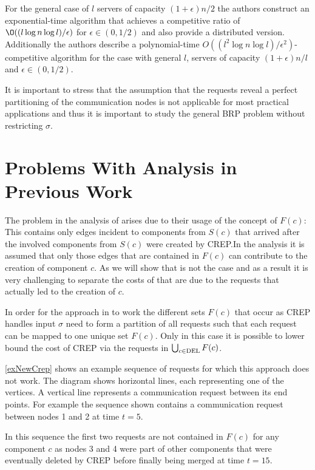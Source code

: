 \documentclass[a4paper,xcolor=dvipsnames, tikz, 12pt]{article}
\newcommand{\nl}{\newline}
\newcommand{\crep}{C{\scriptsize REP}}
\newcommand{\del}{\text{\scriptsize DEL}}
\newcommand{\opt}{\text{O{\scriptsize PT}}}
\theoremstyle{definition}
\begin{document}
	For the general case of $l$ servers of capacity $(1+\epsilon)n/2$ the authors construct an exponential-time algorithm that achieves a competitive ratio of $\O((l\log n \log l)/\epsilon)$ for $\epsilon\in(0,1/2)$ and also provide a distributed version.
	Additionally the authors describe a polynomial-time $O((l^2\log n\log l)/\epsilon^2)$-competitive algorithm for the case with general $l$, servers of capacity $(1+\epsilon)n/l$ and $\epsilon\in(0,1/2)$.
	
	It is important to stress that the assumption that the requests reveal a perfect partitioning of the communication nodes is not applicable for most practical applications and thus it is important to study the general BRP problem without restricting $\sigma$.
	
	
	\section{Problems With Analysis in Previous Work}
	\label{flawsSection}
	The problem in the analysis of \cite{Avin2015a} arises due to their usage of the concept of $F(c)$: This contains only edges incident to components from $S(c)$ that arrived after the involved components from $S(c)$ were created by \crep{}.In the analysis it is assumed that only those edges that are contained in $F(c)$ can contribute to the creation of component $c$. As we will show that is not the case and as a result it is very challenging to separate the costs of \opt{} that are due to the requests that actually led to the creation of $c$.
	
	In order for the approach in \cite{Avin2015a} to work the different sets $F(c)$ that occur as \crep{} handles input $\sigma$ need to form a partition of all requests such that each request can be mapped to one unique set $F(c)$. Only in this case it is possible to lower bound the cost of \crep{} via the requests in $\bigcup_{c\in\del{}}F(c)$.\
	
	\cref{exNewCrep} shows an example sequence of requests for which this approach does not work. The diagram shows horizontal lines, each representing one of the vertices. A vertical line represents a communication request between its end points. For example the sequence shown contains a communication request between nodes 1 and 2 at time $t=5$.
	
	In this sequence the first two requests are not contained in $F(c)$ for any component $c$ as nodes 3 and 4 were part of other components that were eventually deleted by \crep{} before finally being merged at time $t=15$.\nl
	
\end{document}
